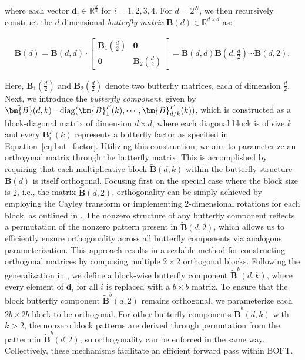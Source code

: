where each vector $\bm{d}_i\in\mathbb{R}^{\frac{k}{2}}$ for $i=1,2,3,4$. For $d=2^N$, we then recursively construct the $d$-dimensional \emph{butterfly matrix} $\bm{B}(d)\in\mathbb{R}^{d\times d}$ as:

\begin{equation}
\begin{aligned}
    \!\!\bm{B}(d)=\tilde{\bm{B}}(d,d)\!\cdot\!\begin{bmatrix}
    \bm{B}_1(\frac{d}{2})\!\!\!\!\! & \bm{0} \\
    \bm{0}\!\!\!\!\! &\bm{B}_2(\frac{d}{2})
    \end{bmatrix}= \tilde{\bm{B}}(d,d)\tilde{\bm{B}}(d,\frac{d}{2})\cdots\tilde{\bm{B}}(d,2),
\end{aligned}
\end{equation}

Here, $\bm{B}_1(\frac{d}{2})$ and $\bm{B}_2(\frac{d}{2})$ denote two butterfly matrices, each of dimension $\frac{d}{2}$. Next, we introduce the \emph{butterfly component}, given by $\thickmuskip=2mu \medmuskip=2mu \tilde{\bm{B}}(d,k)=\text{diag}(\bm{B}^F_1(k),\cdots,\bm{B}^F_{d/k}(k))$, which is constructed as a block-diagonal matrix of dimension $d\times d$, where each diagonal block is of size $k$ and every $\bm{B}^F_i(k)$ represents a butterfly factor as specified in Equation~\ref{eq:but_factor}. Utilizing this construction, we aim to parameterize an orthogonal matrix through the butterfly matrix. This is accomplished by requiring that each multiplicative block $\tilde{\bm{B}}(d,k)$ within the butterfly structure $\bm{B}(d)$ is itself orthogonal. Focusing first on the special case where the block size is $2$, i.e., the matrix $\tilde{\bm{B}}(d,2)$, orthogonality can be simply achieved by employing the Cayley transform or implementing $2$-dimensional rotations for each block, as outlined in \cite{liu2021orthogonal,qiu2023controlling}. The nonzero structure of any butterfly component reflects a permutation of the nonzero pattern present in $\tilde{\bm{B}}(d,2)$, which allows us to efficiently ensure orthogonality across all butterfly components via analogous parameterization. This approach results in a scalable method for constructing orthogonal matrices by composing multiple $2\times 2$ orthogonal blocks. Following the generalization in \cite{chen2022pixelated}, we define a block-wise butterfly component $\tilde{\bm{B}}^b(d,k)$, where every element of $\bm{d}_i$ for all $i$ is replaced with a $b\times b$ matrix. To ensure that the block butterfly component $\tilde{\bm{B}}^b(d,2)$ remains orthogonal, we parameterize each $2b\times 2b$ block to be orthogonal. For other butterfly components $\tilde{\bm{B}}^b(d,k)$ with $k>2$, the nonzero block patterns are derived through permutation from the pattern in $\tilde{\bm{B}}^b(d,2)$, so orthogonality can be enforced in the same way. Collectively, these mechanisms facilitate an efficient forward pass within BOFT.

